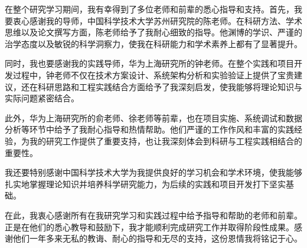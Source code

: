 
\begin{acknowledgements}
在整个研究学习期间，我有幸得到了多位老师和前辈的悉心指导和支持。首先，我要衷心感谢我的导师，中国科学技术大学苏州研究院的陈老师。在科研方法、学术思维以及论文撰写方面，陈老师给予了我耐心细致的指导。他渊博的学识、严谨的治学态度以及敏锐的科学洞察力，使我在科研能力和学术素养上都有了显著提升。

同时，我也要感谢我的实践导师，华为上海研究所的钟老师。在整个实践和项目开发过程中，钟老师不仅在技术方案设计、系统架构分析和实验验证上提供了宝贵建议，还在科研思路和工程实践结合方面给予了我深刻启发，使我能够将理论知识与实际问题紧密结合。

此外，华为上海研究所的俞老师、徐老师等前辈，也在项目实施、系统调试和数据分析等环节中给予了我耐心指导和热情帮助。他们严谨的工作作风和丰富的实践经验，为我的研究工作提供了重要支持，也让我深刻体会到科研与工程实践相结合的重要性。

我还要特别感谢中国科学技术大学为我提供良好的学习机会和学术环境，使我能够扎实地掌握理论知识并培养科学研究能力，为后续的实践和项目开发打下坚实基础。

在此，我衷心感谢所有在我研究学习和实践过程中给予指导和帮助的老师和前辈。正是在他们的悉心教导和鼓励下，我才能顺利完成研究工作并取得阶段性成果。感谢他们一年多来无私的教诲、耐心的指导和无尽的支持，这份恩情我将铭记于心。
\end{acknowledgements}
